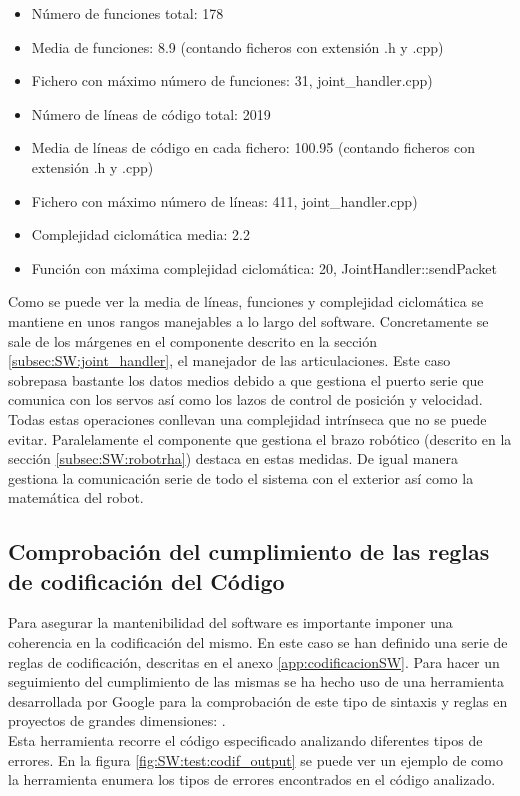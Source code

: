 	\begin{itemize}
		\item Número de funciones total: 178
		\item Media de funciones: 8.9 (contando ficheros con extensión .h y .cpp)
		\item Fichero con máximo número de funciones: 31,  joint\_handler.cpp)
		\item Número de líneas de código total: 2019
		\item Media de líneas de código en cada fichero: 100.95 (contando ficheros con extensión .h y .cpp)
		\item Fichero con máximo número de líneas: 411,  joint\_handler.cpp)
		\item Complejidad ciclomática media: 2.2
		\item Función con máxima complejidad ciclomática: 20, JointHandler::sendPacket
	\end{itemize}
	
	Como se puede ver la media de líneas, funciones y complejidad ciclomática se mantiene en unos rangos manejables a lo largo del software. Concretamente se sale de los márgenes en el componente descrito en la sección \ref{subsec:SW:joint_handler}, el manejador de las articulaciones. Este caso sobrepasa bastante los datos medios debido a que gestiona el puerto serie que comunica con los servos así como los lazos de control de posición y velocidad. Todas estas operaciones conllevan una complejidad intrínseca que no se puede evitar. Paralelamente el componente que gestiona el brazo robótico (descrito en la sección \ref{subsec:SW:robotrha}) destaca en estas medidas. De igual manera gestiona la comunicación serie de todo el sistema con el exterior así como la matemática del robot.

    \subsection{Comprobación del cumplimiento de las reglas de codificación del Código}
        Para asegurar la mantenibilidad del software es importante imponer una coherencia en la codificación del mismo. En este caso se han definido una serie de reglas de codificación, descritas en el anexo \ref{app:codificacionSW}. Para hacer un seguimiento del cumplimiento de las mismas se ha hecho uso de una herramienta desarrollada por Google para la comprobación de este tipo de sintaxis y reglas en proyectos de grandes dimensiones: .
        \\
        Esta herramienta recorre el código especificado analizando diferentes tipos de errores. En la figura \ref{fig:SW:test:codif_output} se puede ver un ejemplo de como la herramienta enumera los tipos de errores encontrados en el código analizado.

